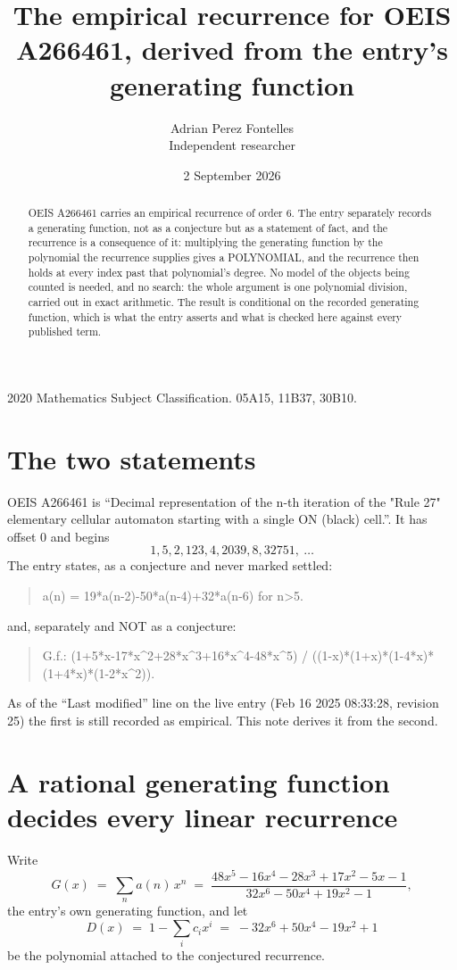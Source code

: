 \documentclass[11pt,a4paper]{article}
\title{The empirical recurrence for OEIS A266461, derived from the entry's generating function}
\author{Adrian Perez Fontelles\\ \small Independent researcher}
\date{2 September 2026}
\theoremstyle{plain}
\theoremstyle{definition}
\begin{document}
\maketitle

\begin{abstract}
OEIS A266461 carries an empirical recurrence of order $6$. The entry separately records a
generating function, not as a conjecture but as a statement of fact, and the recurrence is a
consequence of it: multiplying the generating function by the polynomial the recurrence
supplies gives a POLYNOMIAL, and the recurrence then holds at every index past that
polynomial's degree. No model of the objects being counted is needed, and no search: the
whole argument is one polynomial division, carried out in exact arithmetic. The result is
conditional on the recorded generating function, which is what the entry asserts and what is
checked here against every published term.
\end{abstract}

\noindent\small 2020 Mathematics Subject Classification. 05A15, 11B37, 30B10.\normalsize

\section{The two statements}

OEIS A266461 is ``Decimal representation of the n-th iteration of the "Rule 27" elementary cellular automaton starting with a single ON (black) cell.''. It has offset $0$ and begins
\[
1, 5, 2, 123, 4, 2039, 8, 32751,\ \dots
\]
The entry states, as a conjecture and never marked settled:
\begin{quote}
a(n) = 19*a(n-2)-50*a(n-4)+32*a(n-6) for n>5.
\end{quote}
and, separately and NOT as a conjecture:
\begin{quote}
G.f.: (1+5*x-17*x\^{}2+28*x\^{}3+16*x\^{}4-48*x\^{}5) / ((1-x)*(1+x)*(1-4*x)*(1+4*x)*(1-2*x\^{}2)).
\end{quote}
As of the ``Last modified'' line on the live entry (Feb 16 2025 08:33:28, revision 25) the first is still
recorded as empirical. This note derives it from the second.

\section{A rational generating function decides every linear recurrence}

Write
\[
G(x)\;=\;\sum_{n}a(n)\,x^{n}\;=\;\frac{48 x^{5} - 16 x^{4} - 28 x^{3} + 17 x^{2} - 5 x - 1}{32 x^{6} - 50 x^{4} + 19 x^{2} - 1},
\]
the entry's own generating function, and let
\[
D(x)\;=\;1-\sum_i c_i x^{i}\;=\;- 32 x^{6} + 50 x^{4} - 19 x^{2} + 1
\]
be the polynomial attached to the conjectured recurrence.
\end{document}
